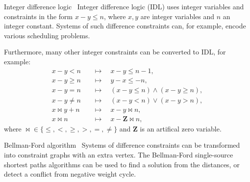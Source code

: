 \documentclass{beamer}
\begin{document}
\begin{frame}[fragile,t]
\begin{columns}[t,onlytextwidth]
\begin{column}{0.485\textwidth}
		\begin{block}{Integer difference logic~\cite{slides}}
			Integer difference logic (IDL) uses integer variables and constraints in the form $x - y \leq n$, where $x, y$ are integer variables and $n$ an integer constant. Systems of such difference constraints can, for example, encode various scheduling problems.
			
			Furthermore, many other integer constraints can be converted to IDL, for example:
			\begin{align*}
				x - y < n \quad&\mapsto\quad x - y \leq n - 1, \\
				x - y \geq n \quad&\mapsto\quad y - x \leq -n, \\
				x - y = n \quad&\mapsto\quad (x - y \leq n) \land (x - y \geq n), \\
				x - y \neq n \quad&\mapsto\quad (x - y < n) \lor (x - y > n), \\
				x \bowtie y + n \quad&\mapsto\quad x - y \bowtie n, \\
				x \bowtie n \quad&\mapsto\quad x - \mathbf{Z} \bowtie n,
			\end{align*}
			where ${\bowtie} \in \{\leq, <, \geq, >, =, \neq\}$ and $\mathbf{Z}$ is an artifical zero variable.
		\end{block}

		\begin{block}{Bellman-Ford algorithm~\cite{CLRS}}
			Systems of difference constraints can be transformed into constraint graphs with an extra vertex. The Bellman-Ford single-source shortest paths algorithms can be used to find a solution from the distances, or detect a conflict from negative weight cycle.


\end{block}
\end{column}
\end{columns}
\end{frame}
\end{document}
